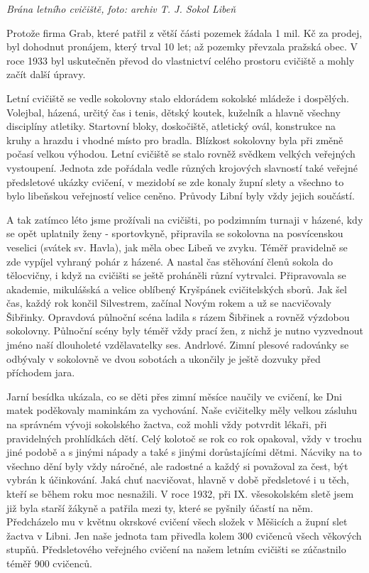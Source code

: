 \emph{Brána letního cvičiště, foto: archiv T. J. Sokol Libeň}

Protože firma Grab, které patřil z větší části pozemek žádala 1 mil. Kč
za prodej, byl dohodnut pronájem, který trval 10 let; až pozemky
převzala pražská obec. V roce 1933 byl uskutečněn převod do vlastnictví
celého prostoru cvičiště a mohly začít další úpravy.

Letní cvičiště se vedle sokolovny stalo eldorádem sokolské mládeže i
dospělých. Volejbal, házená, určitý čas i tenis, dětský koutek, kuželník
a hlavně všechny disciplíny atletiky. Startovní bloky, doskočiště,
atletický ovál, konstrukce na kruhy a hrazdu i vhodné místo pro bradla.
Blízkost sokolovny byla při změně počasí velkou výhodou. Letní cvičiště
se stalo rovněž svědkem velkých veřejných vystoupení. Jednota zde
pořádala vedle různých krojových slavností také veřejné předsletové
ukázky cvičení, v mezidobí se zde konaly župní slety a všechno to bylo
libeňskou veřejností velice ceněno. Průvody Libní byly vždy jejich
součástí.

A tak zatímco léto jsme prožívali na cvičišti, po podzimním turnaji v
házené, kdy se opět uplatnily ženy - sportovkyně, připravila se
sokolovna na posvícenskou veselici (svátek sv. Havla), jak měla obec
Libeň ve zvyku. Téměř pravidelně se zde vypíjel vyhraný pohár z házené.
A nastal čas stěhování členů sokola do tělocvičny, i když na cvičišti se
ještě proháněli různí vytrvalci. Připravovala se akademie, mikulášská a
velice oblíbený Kryšpánek cvičitelských sborů. Jak šel čas, každý rok
končil Silvestrem, začínal Novým rokem a už se nacvičovaly Šibřinky.
Opravdová půlnoční scéna ladila s rázem Šibřinek a rovněž výzdobou
sokolovny. Půlnoční scény byly téměř vždy prací žen, z nichž je nutno
vyzvednout jméno naší dlouholeté vzdělavatelky ses. Andrlové. Zimní
plesové radovánky se odbývaly v sokolovně ve dvou sobotách a ukončily je
ještě dozvuky před příchodem jara.

Jarní besídka ukázala, co se děti přes zimní měsíce naučily ve cvičení,
ke Dni matek poděkovaly maminkám za vychování. Naše cvičitelky měly
velkou zásluhu na správném vývoji sokolského žactva, což mohli vždy
potvrdit lékaři, při pravidelných prohlídkách dětí. Celý kolotoč se rok
co rok opakoval, vždy v trochu jiné podobě a s jinými nápady a také s
jinými dorůstajícími dětmi. Nácviky na to všechno dění byly vždy
náročné, ale radostné a každý si považoval za čest, být vybrán k
účinkování. Jaká chuť nacvičovat, hlavně v době předsletové i u těch,
kteří se během roku moc nesnažili. V roce 1932, při IX. všesokolském
sletě jsem již byla starší žákyně a patřila mezi ty, které se pyšnily
účastí na něm. Předcházelo mu v květnu okrskové cvičení všech složek v
Měšicích a župní slet žactva v Libni. Jen naše jednota tam přivedla
kolem 300 cvičenců všech věkových stupňů. Předsletového veřejného
cvičení na našem letním cvičišti se zúčastnilo téměř 900 cvičenců.

